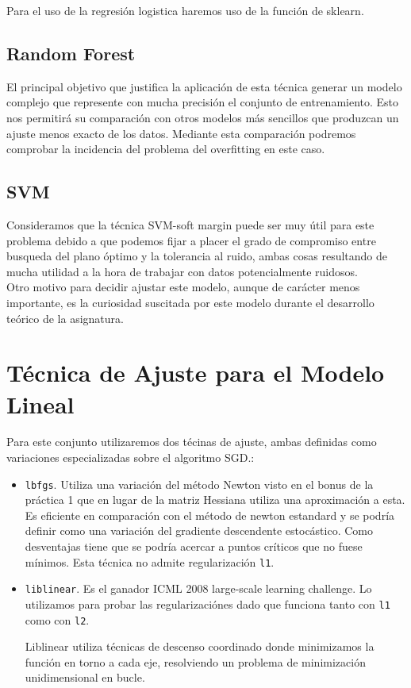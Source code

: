 \documentclass[11pt,a4paper]{article}
\begin{document}
Para el uso de la regresión logistica haremos uso de la función de sklearn. 

\subsection{Random Forest}

El principal objetivo que justifica la aplicación de esta técnica generar un modelo complejo que represente con mucha precisión el conjunto de entrenamiento. Esto nos permitirá su comparación con otros modelos más sencillos que produzcan un ajuste menos exacto de los datos. Mediante esta comparación podremos comprobar la incidencia del problema del overfitting en este caso.

\subsection{SVM}

Consideramos que la técnica SVM-soft margin puede ser muy útil para este problema debido a que podemos fijar a placer el grado de compromiso entre busqueda del plano óptimo y la tolerancia al ruido, ambas cosas resultando de mucha utilidad a la hora de trabajar con datos potencialmente ruidosos.\\

Otro motivo para decidir ajustar este modelo, aunque de carácter menos importante, es la curiosidad suscitada por este modelo durante el desarrollo teórico de la asignatura. 

\section{ Técnica de Ajuste para el Modelo Lineal}
Para este conjunto utilizaremos dos técinas de ajuste, ambas definidas como variaciones especializadas sobre el algoritmo SGD.:
\begin{itemize}
	\item \texttt{lbfgs}. Utiliza una variación del método Newton visto en el bonus de la práctica 1 que en lugar de la matriz Hessiana utiliza una aproximación a esta. Es eficiente en comparación con el método de newton estandard y se podría definir como una variación del gradiente descendente estocástico. Como desventajas tiene que se podría acercar a puntos críticos que no fuese mínimos. Esta técnica no admite regularización \texttt{l1}.
	\item \texttt{liblinear}. Es el ganador ICML 2008 large-scale learning challenge. Lo utilizamos para probar las regularizaciónes dado que funciona tanto con \texttt{l1} como con \texttt{l2}.
	
	Liblinear utiliza técnicas de descenso coordinado\cite{CD} donde minimizamos la función en torno a cada eje, resolviendo un problema de minimización unidimensional en bucle. 
\end{itemize}
\end{document}
